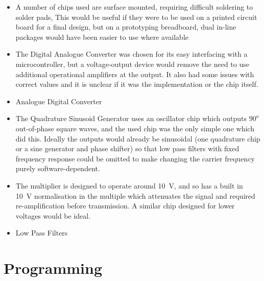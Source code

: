 \documentclass[../main.tex]{subfiles}
\begin{document}
\begin{itemize}
	\item A number of chips used are surface mounted, requiring difficult soldering to solder pads, This would be useful if they were to be used on a printed circuit board for a final design, but on a prototyping breadboard, dual in-line packages would have been easier to use where available
	\item The Digital Analogue Converter was chosen for its easy interfacing with a microcontroller, but a voltage-output device would remove the need to use additional operational amplifiers at the output. It also had some issues with correct values and it is unclear if it was the implementation or the chip itself.
	\item Analogue Digital Converter
	\item The Quadrature Sinusoid Generator uses an oscillator chip which outputs $90^o$ out-of-phase square waves, and the used chip was the only simple one which did this. Ideally the outputs would already be sinusoidal (one quadrature chip or a sine generator and phase shifter) so that low pass filters with fixed frequency response could be omitted to make changing the carrier frequency purely software-dependent.
	\item The multiplier is designed to operate around \SI{10}{\volt}, and so has a built in \SI{10}{\volt} normalisation in the multiple which attenuates the signal and required re-amplification before transmission. A similar chip designed for lower voltages would be ideal.
	\item Low Pass Filters
\end{itemize}

\clearpage


\section{Programming}
\end{document}
